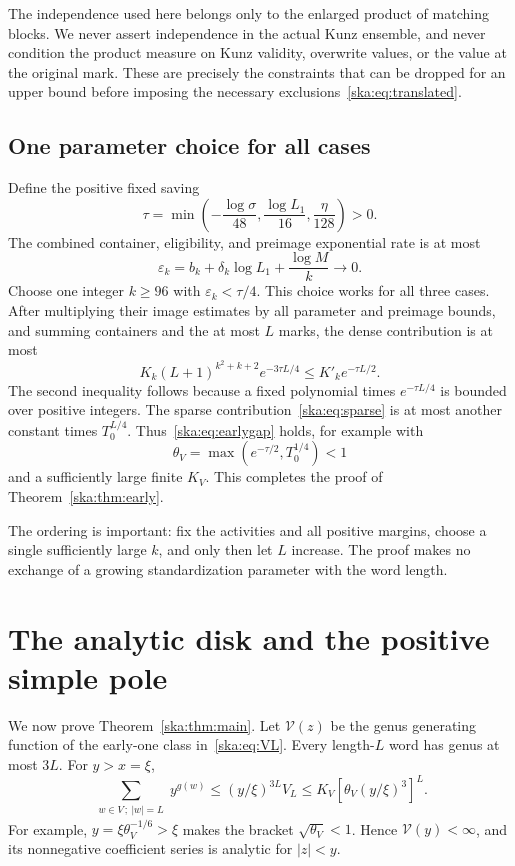 \documentclass[11pt,letterpaper]{article}
\theoremstyle{definition}
\newcommand{\eps}{\varepsilon}\newcommand{\wt}{\operatorname{wt}}
\newcommand{\cV}{\mathcal V}\newcommand{\cT}{\mathcal T}
\begin{document}
The independence used here belongs only to the enlarged product of matching blocks. We never assert independence in the actual Kunz ensemble, and never condition the product measure on Kunz validity, overwrite values, or the value at the original mark. These are precisely the constraints that can be dropped for an upper bound before imposing the necessary exclusions~\eqref{ska:eq:translated}.

\subsection{One parameter choice for all cases}
Define the positive fixed saving
\begin{equation}\label{ska:eq:tau}
\tau=\min\left(-\frac{\log\sigma}{48},
\frac{\log L_1}{16},\frac\eta{128}\right)>0.
\end{equation}
The combined container, eligibility, and preimage exponential rate is at most
\begin{equation}\label{ska:eq:epsilonk}
\eps_k=b_k+\delta_k\log L_1+\frac{\log M}{k}\longrightarrow0.
\end{equation}
Choose one integer $k\ge96$ with $\eps_k<\tau/4$. This choice works for all three cases. After multiplying their image estimates by all parameter and preimage bounds, and summing containers and the at most $L$ marks, the dense contribution is at most
\[
K_k(L+1)^{k^2+k+2}e^{-3\tau L/4}
\le K'_k e^{-\tau L/2}.
\]
The second inequality follows because a fixed polynomial times $e^{-\tau L/4}$ is bounded over positive integers. The sparse contribution~\eqref{ska:eq:sparse} is at most another constant times $T_0^{L/4}$. Thus~\eqref{ska:eq:earlygap} holds, for example with
\[
\theta_V=\max(e^{-\tau/2},T_0^{1/4})<1
\]
and a sufficiently large finite $K_V$. This completes the proof of Theorem~\ref{ska:thm:early}.

The ordering is important: fix the activities and all positive margins, choose a single sufficiently large $k$, and only then let $L$ increase. The proof makes no exchange of a growing standardization parameter with the word length.

\section{The analytic disk and the positive simple pole}\label{ska:sec:analytic}
We now prove Theorem~\ref{ska:thm:main}. Let $\cV(z)$ be the genus generating function of the early-one class in~\eqref{ska:eq:VL}. Every length-$L$ word has genus at most $3L$. For $y>x=\xi$,
\[
\sum_{\substack{w\in V\,;\ |w|=L}}y^{g(w)}
\le (y/\xi)^{3L}V_L
\le K_V[\theta_V(y/\xi)^3]^L.
\]
For example, $y=\xi\theta_V^{-1/6}>\xi$ makes the bracket $\sqrt{\theta_V}<1$. Hence $\cV(y)<\infty$, and its nonnegative coefficient series is analytic for $|z|<y$.
\end{document}
